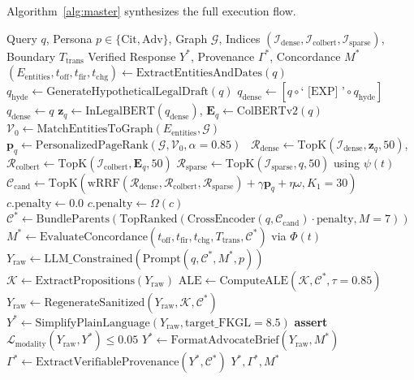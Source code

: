 \documentclass[conference]{IEEEtran}
\begin{document}
Algorithm~\ref{alg:master} synthesizes the full execution flow.

\begin{algorithm}[!t]
\caption{Nirnay-X Master Retrieval, Generation, and Verification Pipeline}
\label{alg:master}
\begin{algorithmic}[1]
\Require Query $q$, Persona $p \in \{\text{Cit}, \text{Adv}\}$, Graph $\mathcal{G}$, Indices $(\mathcal{I}_{\text{dense}}, \mathcal{I}_{\text{colbert}}, \mathcal{I}_{\text{sparse}})$, Boundary $T_{\text{trans}}$
\Ensure Verified Response $Y^*$, Provenance $\Gamma^*$, Concordance $M^*$
\State $(E_{\text{entities}}, t_{\text{off}}, t_{\text{fir}}, t_{\text{chg}}) \gets \text{ExtractEntitiesAndDates}(q)$
    \State $q_{\text{hyde}} \gets \text{GenerateHypotheticalLegalDraft}(q)$
    \State $q_{\text{dense}} \gets [q \circ \text{` [EXP] '} \circ q_{\text{hyde}}]$
\Else
    \State $q_{\text{dense}} \gets q$
\EndIf
\State $\mathbf{z}_q \gets \text{InLegalBERT}(q_{\text{dense}})$, $\mathbf{E}_q \gets \text{ColBERTv2}(q)$
\State $\mathcal{V}_0 \gets \text{MatchEntitiesToGraph}(E_{\text{entities}}, \mathcal{G})$
\State $\mathbf{p}_q \gets \text{PersonalizedPageRank}(\mathcal{G}, \mathcal{V}_0, \alpha=0.85)$~\cite{page1999pagerank}
\State $\mathcal{R}_{\text{dense}} \gets \text{TopK}(\mathcal{I}_{\text{dense}}, \mathbf{z}_q, 50)$, $\mathcal{R}_{\text{colbert}} \gets \text{TopK}(\mathcal{I}_{\text{colbert}}, \mathbf{E}_q, 50)$
\State $\mathcal{R}_{\text{sparse}} \gets \text{TopK}(\mathcal{I}_{\text{sparse}}, q, 50)$ using $\psi(t)$
\State $\mathcal{C}_{\text{cand}} \gets \text{TopK}(\text{wRRF}(\mathcal{R}_{\text{dense}}, \mathcal{R}_{\text{colbert}}, \mathcal{R}_{\text{sparse}}) + \gamma \mathbf{p}_q + \eta \omega, K_1=30)$
        \State $c.\text{penalty} \gets 0.0$ 
    \Else
        \State $c.\text{penalty} \gets \Omega(c)$
    \EndIf
\EndFor
\State $\mathcal{C}^* \gets \text{BundleParents}(\text{TopRanked}(\text{CrossEncoder}(q, \mathcal{C}_{\text{cand}}) \cdot \text{penalty}, M=7))$
\State $M^* \gets \text{EvaluateConcordance}(t_{\text{off}}, t_{\text{fir}}, t_{\text{chg}}, T_{\text{trans}}, \mathcal{C}^*)$ via $\Phi(t)$
\State $Y_{\text{raw}} \gets \text{LLM\_Constrained}(\text{Prompt}(q, \mathcal{C}^*, M^*, p))$
\State $\mathcal{K} \gets \text{ExtractPropositions}(Y_{\text{raw}})$
\State $\text{ALE} \gets \text{ComputeALE}(\mathcal{K}, \mathcal{C}^*, \tau=0.85)$
    \State $Y_{\text{raw}} \gets \text{RegenerateSanitized}(Y_{\text{raw}}, \mathcal{K}, \mathcal{C}^*)$
\EndIf
{}
    \State $Y^* \gets \text{SimplifyPlainLanguage}(Y_{\text{raw}}, \text{target\_FKGL}=8.5)$
    \State \textbf{assert} $\mathcal{L}_{\text{modality}}(Y_{\text{raw}}, Y^*) \le 0.05$
\Else
    \State $Y^* \gets \text{FormatAdvocateBrief}(Y_{\text{raw}}, M^*)$
\EndIf
\State $\Gamma^* \gets \text{ExtractVerifiableProvenance}(Y^*, \mathcal{C}^*)$
\State \Return $Y^*, \Gamma^*, M^*$
\end{algorithmic}
\end{algorithm}
\end{document}

